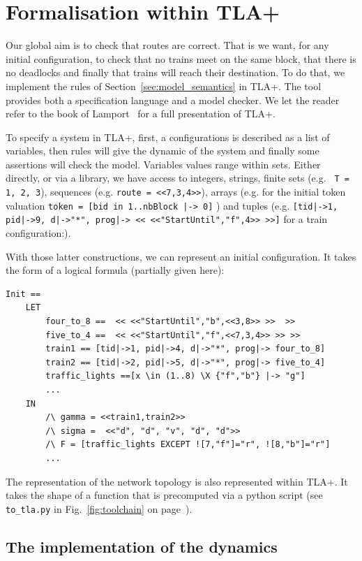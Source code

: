 \documentclass[runningheads]{llncs}
\begin{document}
\section{Formalisation within TLA+}
\label{sec:tla-formalisation}

Our global aim is to check that routes are correct. That is we want, for any initial configuration, to check that no trains meet on the same block, that there is no deadlocks and finally  that trains will reach their destination. To do that, we implement the rules of Section~\ref{sec:model_semantics} in TLA+. The tool provides both a specification language and a model checker. We let the reader refer to the book of Lamport~\cite{Lamport} for a full presentation of TLA+. 

To specify a system in TLA+, first, a configurations is described as a list of variables, then rules  will give the dynamic of the system and finally some assertions  will check the model.  Variables values range within sets. Either directly, or via a library, we have access to integers, strings, finite sets (e.g. \texttt{ T = {1, 2, 3}}), sequences (e.g. \texttt{route = <<7,3,4>>}),  arrays (e.g. for the initial token valuation \texttt{token = [bid in 1..nbBlock |-> 0]} ) and tuples (e.g. \texttt{[tid|->1, pid|->9, d|->"*", prog|-> << <<"StartUntil","f",4>> >>]}  for a train configuration:).

With those latter constructions, we can represent an initial configuration. It takes the form of a logical formula (partially given here):
\begin{verbatim}
Init == 
    LET 
        four_to_8 ==  << <<"StartUntil","b",<<3,8>> >>  >>
        five_to_4 ==  << <<"StartUntil","f",<<7,3,4>> >> >>
        train1 == [tid|->1, pid|->4, d|->"*", prog|-> four_to_8]
        train2 == [tid|->2, pid|->5, d|->"*", prog|-> five_to_4]
        traffic_lights ==[x \in (1..8) \X {"f","b"} |-> "g"]
        ...
    IN
        /\ gamma = <<train1,train2>>
        /\ sigma =  <<"d", "d", "v", "d", "d">> 
        /\ F = [traffic_lights EXCEPT ![7,"f"]="r", ![8,"b"]="r"]
        ...
\end{verbatim}

The representation of the network topology is also represented within TLA+. It takes the shape of a function that is precomputed via a python script (see \texttt{to\_tla.py} in Fig.~\ref{fig:toolchain} on page~\pageref{fig:toolchain}).

\subsection{The implementation of the dynamics}
\end{document}
